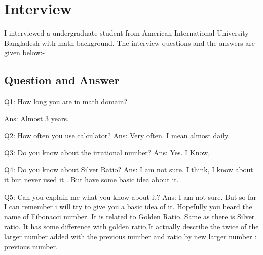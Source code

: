 \section{Interview}
I interviewed a undergraduate student from American International University - Bangladesh with math background. The interview questions and the answers are given below:- 
\newline
\subsection{Question and Answer}
 Q1: How long you are in math domain?\newline

 Ans: Almost 3 years. 
 \newline
 
 Q2: How often you use calculator?\newline
 Ans: Very often. I mean almost daily. 
 \newline
 
 Q3: Do you know about the irrational number?\newline
 Ans: Yes. I Know,
 \newline
 
 Q4: Do you know about Silver Ratio?\newline
 Ans: I am not sure. I think, I know about it but never used it . But have some basic idea about it. \newline
 
 
 Q5: Can you explain me what you know about it?\newline
Ans: I am not sure. But so far I can remember i will try to give you a basic idea of it. Hopefully you heard the name of Fibonacci number. It is related to Golden Ratio. Same as there is Silver ratio. It has some difference with golden ratio.It actually describe the twice  of the larger number added with the previous number and ratio by new larger number : previous number.\newline
